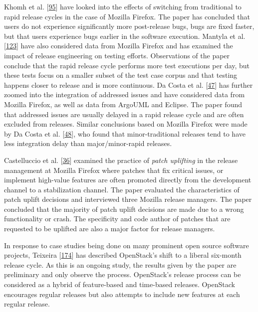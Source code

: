 \documentclass[]{book}
\begin{document}
Khomh et al. {[}\protect\hyperlink{ref-khomh2015a}{95}{]} have looked
into the effects of switching from traditional to rapid release cycles
in the case of Mozilla Firefox. The paper has concluded that users do
not experience significantly more post-release bugs, bugs are fixed
faster, but that users experience bugs earlier in the software
execution. Mantyla et al.
{[}\protect\hyperlink{ref-mantyla2015a}{123}{]} have also considered
data from Mozilla Firefox and has examined the impact of release
engineering on testing efforts. Observations of the paper conclude that
the rapid release cycle performs more test executions per day, but these
tests focus on a smaller subset of the test case corpus and that testing
happens closer to release and is more continuous. Da Costa et al.
{[}\protect\hyperlink{ref-da2014a}{47}{]} has further zoomed into the
integration of addressed issues and have considered data from Mozilla
Firefox, as well as data from ArgoUML and Eclipse. The paper found that
addressed issues are usually delayed in a rapid release cycle and are
often excluded from releases. Similar conclusions based on Mozilla
Firefox were made by Da Costa et al.
{[}\protect\hyperlink{ref-da2016a}{48}{]}, who found that
minor-traditional releases tend to have less integration delay than
major/minor-rapid releases.

Castelluccio et al. {[}\protect\hyperlink{ref-castelluccio2017a}{36}{]}
examined the practice of \emph{patch uplifting} in the release
management at Mozilla Firefox where patches that fix critical issues, or
implement high-value features are often promoted directly from the
development channel to a stabilization channel. The paper evaluated the
characteristics of patch uplift decisions and interviewed three Mozilla
release managers. The paper concluded that the majority of patch uplift
decisions are made due to a wrong functionality or crash. The
specificity and code author of patches that are requested to be uplifted
are also a major factor for release managers.

In response to case studies being done on many prominent open source
software projects, Teixeira
{[}\protect\hyperlink{ref-teixeira2017a}{174}{]} has described
OpenStack's shift to a liberal six-month release cycle. As this is an
ongoing study, the results given by the paper are preliminary and only
observe the process. OpenStack's release process can be considered as a
hybrid of feature-based and time-based releases. OpenStack encourages
regular releases but also attempts to include new features at each
regular release.
\end{document}
